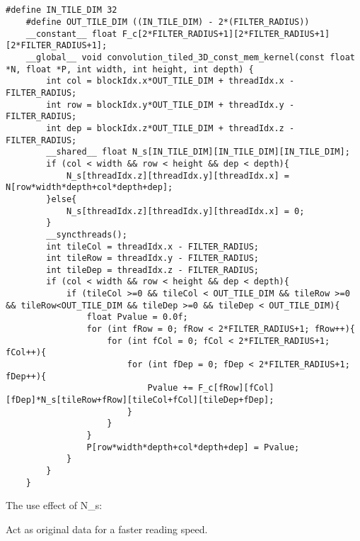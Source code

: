 \documentclass{article}
\begin{document}
\subsection{}
\begin{lstlisting}[basicstyle=\small\ttfamily, breaklines = true]
    #define IN_TILE_DIM 32
    #define OUT_TILE_DIM ((IN_TILE_DIM) - 2*(FILTER_RADIUS))
    __constant__ float F_c[2*FILTER_RADIUS+1][2*FILTER_RADIUS+1][2*FILTER_RADIUS+1];
    __global__ void convolution_tiled_3D_const_mem_kernel(const float *N, float *P, int width, int height, int depth) {
        int col = blockIdx.x*OUT_TILE_DIM + threadIdx.x - FILTER_RADIUS;
        int row = blockIdx.y*OUT_TILE_DIM + threadIdx.y - FILTER_RADIUS;
        int dep = blockIdx.z*OUT_TILE_DIM + threadIdx.z - FILTER_RADIUS;
        __shared__ float N_s[IN_TILE_DIM][IN_TILE_DIM][IN_TILE_DIM];
        if (col < width && row < height && dep < depth){
            N_s[threadIdx.z][threadIdx.y][threadIdx.x] = N[row*width*depth+col*depth+dep];
        }else{
            N_s[threadIdx.z][threadIdx.y][threadIdx.x] = 0;
        }
        __syncthreads();
        int tileCol = threadIdx.x - FILTER_RADIUS;
        int tileRow = threadIdx.y - FILTER_RADIUS;
        int tileDep = threadIdx.z - FILTER_RADIUS;
        if (col < width && row < height && dep < depth){
            if (tileCol >=0 && tileCol < OUT_TILE_DIM && tileRow >=0 && tileRow<OUT_TILE_DIM && tileDep >=0 && tileDep < OUT_TILE_DIM){
                float Pvalue = 0.0f;
                for (int fRow = 0; fRow < 2*FILTER_RADIUS+1; fRow++){
                    for (int fCol = 0; fCol < 2*FILTER_RADIUS+1; fCol++){
                        for (int fDep = 0; fDep < 2*FILTER_RADIUS+1; fDep++){
                            Pvalue += F_c[fRow][fCol][fDep]*N_s[tileRow+fRow][tileCol+fCol][tileDep+fDep];
                        }
                    }
                }
                P[row*width*depth+col*depth+dep] = Pvalue;
            }
        }
    }    
\end{lstlisting}

The use effect of N\_s:

Act as original data for a faster reading speed.
\end{document}
